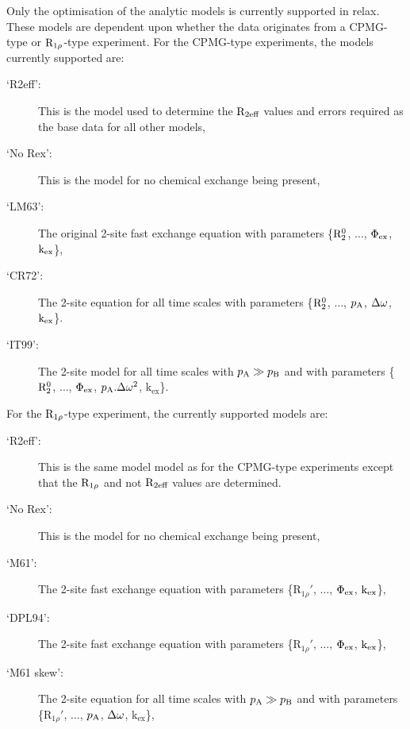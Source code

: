 Only the optimisation of the analytic models is currently supported in relax.  These models are dependent upon whether the data originates from a CPMG-type or $\mathrm{R}_{1\rho}$-type experiment.  For the CPMG-type experiments, the models currently supported are:

\begin{description}
\item[`R2eff':]  This is the model used to determine the $\mathrm{R}_{2\textrm{eff}}$ values and errors required as the base data for all other models,
\item[`No Rex':]  This is the model for no chemical exchange being present,
\item[`LM63':]  The original \citet{LuzMeiboom63} 2-site fast exchange equation with parameters \{$\mathrm{R}_2^0$, $\dots$, $\Phi_\textrm{ex}$, $\textrm{k}_\textrm{ex}$\},
\item[`CR72':]  The \citet{CarverRichards72} 2-site equation for all time scales with parameters \{$\mathrm{R}_2^0$, $\dots$, $p_\textrm{A}$, $\Delta\omega$, $\textrm{k}_\textrm{ex}$\}.
\item[`IT99':]  The \citet{IshimaTorchia99} 2-site model for all time scales with $p_\textrm{A} \gg p_\textrm{B}$ and with parameters \{$\mathrm{R}_2^0$, $\dots$, $\Phi_\textrm{ex}$, $p_\textrm{A}.\Delta\omega^2$, k$_\textrm{ex}$\}.
\end{description}

For the $\mathrm{R}_{1\rho}$-type experiment, the currently supported models are:

\begin{description}
\item[`R2eff':]  This is the same model model as for the CPMG-type experiments except that the $\mathrm{R}_{1\rho}$ and not $\mathrm{R}_{2\textrm{eff}}$ values are determined.
\item[`No Rex':]  This is the model for no chemical exchange being present,
\item[`M61':]  The \citet{Meiboom61} 2-site fast exchange equation with parameters \{$\mathrm{R}_{1\rho}'$, $\dots$, $\Phi_\textrm{ex}$, $\textrm{k}_\textrm{ex}$\},
\item[`DPL94':]  The \citet{Davis94} 2-site fast exchange equation with parameters \{$\mathrm{R}_{1\rho}'$, $\dots$, $\Phi_\textrm{ex}$, $\textrm{k}_\textrm{ex}$\},
\item[`M61 skew':]  The \citet{Meiboom61} 2-site equation for all time scales with $p_\textrm{A} \gg p_\textrm{B}$ and with parameters \{$\mathrm{R}_{1\rho}'$, $\dots$, $p_\textrm{A}$, $\Delta\omega$, k$_\textrm{ex}$\},
\end{description}

